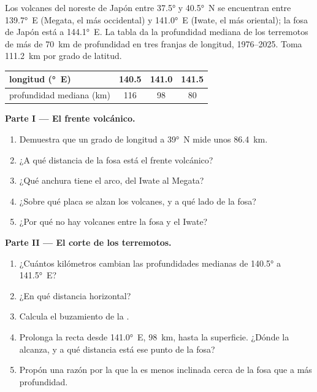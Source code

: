 \begin{problem}
\label{pb:g12:subduction-magmatism:1}
Los volcanes del noreste de Japón entre \ang{37.5} y \ang{40.5}~N se
encuentran entre \ang{139.7}~E (Megata, el más occidental) y \ang{141.0}~E
(Iwate, el más oriental); la fosa de Japón está a \ang{144.1}~E. La tabla da la
profundidad mediana de los terremotos de más de \qty{70}{km} de profundidad en
tres franjas de longitud, 1976--2025. Toma \qty{111.2}{km} por grado de
latitud.

\begin{center}
\small
\begin{tabular}{|l|c|c|c|}
\hline
longitud (\unit{\degree}~E) & 140.5 & 141.0 & 141.5 \\ \hline
profundidad mediana (\unit{km}) & 116 & 98 & 80 \\ \hline
\end{tabular}
\end{center}

\medskip
\noindent\textbf{Parte I --- El frente volcánico.}
\begin{enumerate}
  \item Demuestra que un grado de longitud a \ang{39}~N mide unos
        \qty{86.4}{km}.
  \item ¿A qué distancia de la fosa está el frente volcánico?
  \item ¿Qué anchura tiene el arco, del Iwate al Megata?
  \item ¿Sobre qué placa se alzan los volcanes, y a qué lado de la fosa?
  \item ¿Por qué no hay volcanes entre la fosa y el Iwate?
\end{enumerate}

\medskip
\noindent\textbf{Parte II --- El corte de los terremotos.}
\begin{enumerate}[resume]
  \item ¿Cuántos kilómetros cambian las profundidades medianas de
        \ang{140.5} a \ang{141.5}~E?
  \item ¿En qué distancia horizontal?
  \item Calcula el buzamiento de la .
  \item Prolonga la recta desde \ang{141.0}~E, \qty{98}{km}, hasta la
        superficie. ¿Dónde la alcanza, y a qué distancia está ese punto de la fosa?
  \item Propón una razón por la que la  es menos inclinada cerca de la
        fosa que a más profundidad.
\end{enumerate}


\end{problem}
